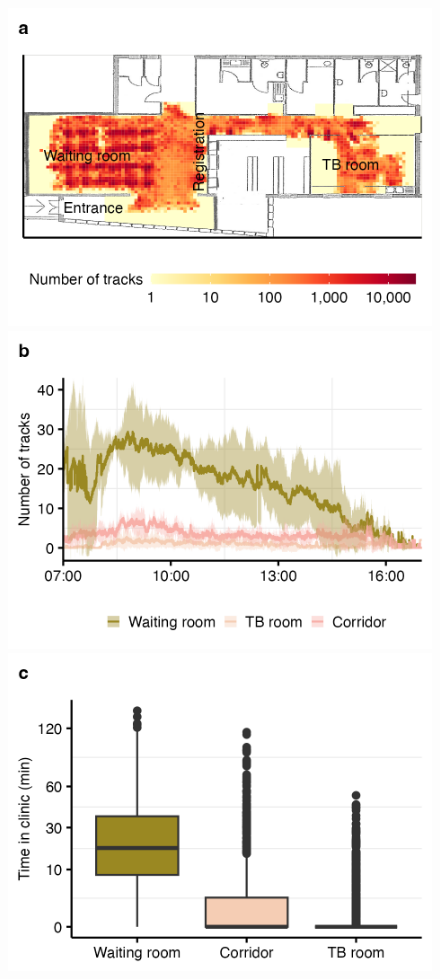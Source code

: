 \documentclass[fleqn,11pt]{wlscirep}
\begin{document}
\begin{figure}
    \centering
     \includegraphics{results/data/no-people-spatial.png}
    \includegraphics{results/data/no-people-over-time.png}
    \includegraphics{results/data/time-in-clinic.png}

\end{figure}
\end{document}
